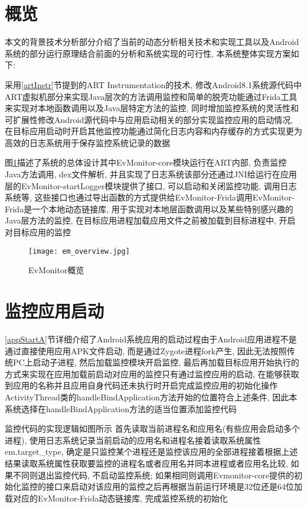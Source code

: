 \section{概览}
本文的背景技术分析部分介绍了当前的动态分析相关技术和实现工具以及Android系统的部分运行原理\juhao 结合前面的分析和系统实现的可行性, 本系统整体实现方案如下:

采用\ref{artInstr}节提到的ART Instrumentation的技术, 修改Android8.1系统源代码中ART虚拟机部分来实现Java层次的方法调用监控和简单的脱壳功能\juhao 通过Frida工具来实现对本地函数调用以及Java层特定方法的监控, 同时增加监控系统的灵活性和可扩展性\juhao 修改Android源代码中与应用启动相关的部分实现监控应用的启动情况, 在目标应用启动时开启其他监控功能\juhao 通过简化日志内容和内存缓存的方式实现更为高效的日志系统用于保存监控系统记录的数据\juhao 

图\ref{emOverview}描述了系统的总体设计\juhao 其中EvMonitor-core模块运行在ART内部, 负责监控Java方法调用, dex文件解析, 并且实现了日志系统\juhao 该部分还通过JNI给运行在应用层的EvMonitor-startLogger模块提供了接口, 可以启动和关闭监控功能, 调用日志系统等, 这些接口也通过导出函数的方式提供给EvMonitor-Frida调用\juhao EvMonitor-Frida是一个本地动态链接库, 用于实现对本地层函数调用以及某些特别感兴趣的Java层方法的监控, 在目标应用进程加载应用文件之前被加载到目标进程中, 开启对目标应用的监控\juhao 
\begin{figure}[ht]
	\centering
	\texttt{[image: em\_overview.jpg]}
	\caption{EvMonitor概览}
	\label{emOverview}
\end{figure}

\section{监控应用启动}
\ref{appStartA}节详细介绍了Android系统应用的启动过程\juhao 由于Android应用进程不是通过直接使用应用APK文件启动, 而是通过Zygote进程fork产生, 因此无法按照传统PC上启动子进程, 然后加载监控模块开启监控, 最后再加载目标应用开始执行的方式来实现在应用加载前启动对应用的监控\juhao 只有通过监控应用的启动, 在能够获取到应用的名称并且应用自身代码还未执行时开启完成监控应用的初始化操作\juhao ActivityThread类的handleBindApplication方法开始的位置符合上述条件, 因此本系统选择在handleBindApplication方法的适当位置添加监控代码\juhao 

监控代码的实现逻辑如图所示\juhao
首先读取当前进程名和应用名(有些应用会启动多个进程), 使用日志系统记录当前启动的应用名和进程名\juhao 接着读取系统属性em.target\_type, 确定是只监控某个进程还是监控该应用的全部进程\juhao 接着根据上述结果读取系统属性获取要监控的进程名或者应用名并同本进程或者应用名比较, 如果不同则退出监控代码, 不启动监控系统; 如果相同则调用Evmonitor-core提供的初始化监控的接口来启动对该应用的监控\juhao 之后再根据当前运行环境是32位还是64位加载对应的EvMonitor-Frida动态链接库, 完成监控系统的初始化\juhao 

